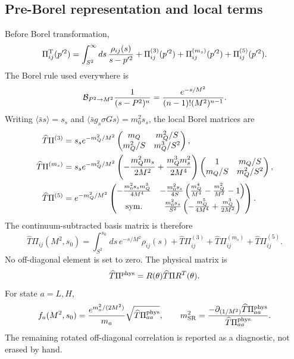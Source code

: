 \documentclass[11pt,a4paper]{article}
\newcommand{\PiT}{\Pi^{\mathrm T}}
\newcommand{\Twide}{\widehat T}
\begin{document}
\subsection{Pre-Borel representation and local terms}

Before Borel transformation,
\begin{equation}
\PiT_{ij}(p'^2)=\int_{S^2}^{\infty}ds\,{\rho_{ij}(s)\over s-p'^2}
+\Pi^{(3)}_{ij}(p'^2)+\Pi^{(m_s)}_{ij}(p'^2)
+\Pi^{(5)}_{ij}(p'^2).
\end{equation}
The Borel rule used everywhere is
\begin{equation}
\mathcal B_{P^2\to M^2}{1\over(s-P^2)^n}
={e^{-s/M^2}\over(n-1)!(M^2)^{n-1}}.
\label{eq:borel}
\end{equation}
Writing $\langle\bar ss\rangle=s_s$ and
$\langle\bar s g_s\sigma Gs\rangle=m_0^2s_s$, the local Borel matrices are
\begin{align}
\Twide\Pi^{(3)}
&=s_s e^{-m_Q^2/M^2}
\begin{pmatrix}
m_Q&m_Q^2/S\\m_Q^2/S&m_Q^3/S^2
\end{pmatrix},\label{eq:d3}\\
\Twide\Pi^{(m_s)}
&=s_s e^{-m_Q^2/M^2}
\left(-{m_Q^2m_s\over2M^2}
+{m_Q^3m_s^2\over2M^4}\right)
\begin{pmatrix}1&m_Q/S\\m_Q/S&m_Q^2/S^2\end{pmatrix},
\label{eq:d3ms}\\
\Twide\Pi^{(5)}&=e^{-m_Q^2/M^2}
\begin{pmatrix}
-{m_0^2s_s m_Q^3\over4M^4}&
-{m_0^2s_s\over4S}\left({m_Q^4\over M^4}-{m_Q^2\over M^2}-1\right)\\
\text{sym.}&
{m_0^2s_s\over S^2}\left(-{m_Q^5\over4M^4}
+{m_Q^3\over2M^2}\right)
\end{pmatrix}.
\label{eq:d5}
\end{align}
The continuum-subtracted basis matrix is therefore
\begin{equation}
\Twide\Pi_{ij}(M^2,s_0)=
\int_{S^2}^{s_0}ds\,e^{-s/M^2}\rho_{ij}(s)
+\Twide\Pi^{(3)}_{ij}+\Twide\Pi^{(m_s)}_{ij}
+\Twide\Pi^{(5)}_{ij}.
\label{eq:pi2pt}
\end{equation}
No off-diagonal element is set to zero.  The physical matrix is
\begin{equation}
\Twide\Pi^{\rm phys}=R(\theta)\Twide\Pi R^T(\theta).
\end{equation}
For state $a=L,H$,
\begin{equation}
f_a(M^2,s_0)={e^{m_a^2/(2M^2)}\over m_a}
\sqrt{\Twide\Pi^{\rm phys}_{aa}},\qquad
m_{\rm SR}^2={-\partial_{(1/M^2)}\Twide\Pi^{\rm phys}_{aa}
\over\Twide\Pi^{\rm phys}_{aa}}.
\label{eq:residue}
\end{equation}
The remaining rotated off-diagonal correlation is reported as a diagnostic,
not erased by hand.
\end{document}
